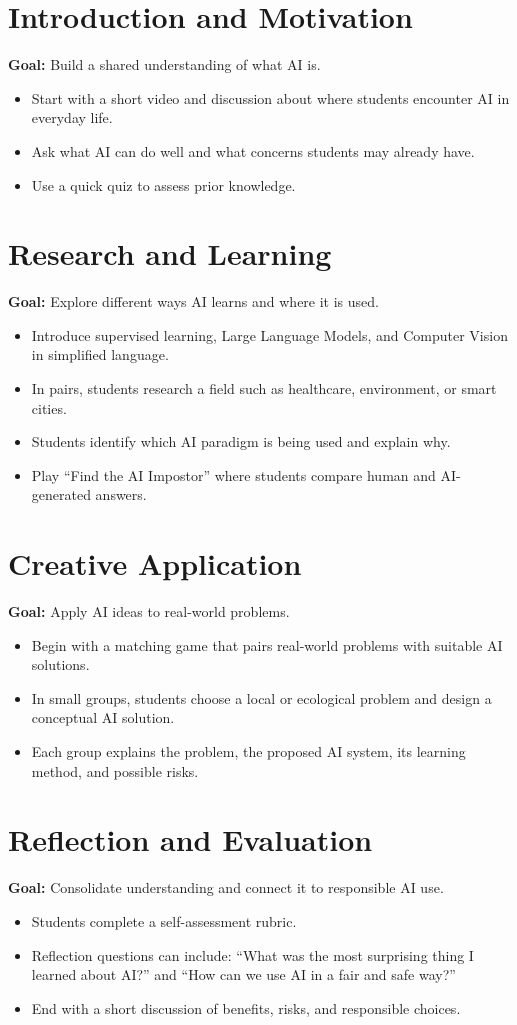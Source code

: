 \documentclass[11pt, a4paper]{article}
\begin{document}
\section{Introduction and Motivation}
\textbf{Goal:} Build a shared understanding of what AI is.
\begin{itemize}
    \item Start with a short video and discussion about where students encounter AI in everyday life.
    \item Ask what AI can do well and what concerns students may already have.
    \item Use a quick quiz to assess prior knowledge.
\end{itemize}

\section{Research and Learning}
\textbf{Goal:} Explore different ways AI learns and where it is used.
\begin{itemize}
    \item Introduce supervised learning, Large Language Models, and Computer Vision in simplified language.
    \item In pairs, students research a field such as healthcare, environment, or smart cities.
    \item Students identify which AI paradigm is being used and explain why.
    \item Play ``Find the AI Impostor'' where students compare human and AI-generated answers.
\end{itemize}

\section{Creative Application}
\textbf{Goal:} Apply AI ideas to real-world problems.
\begin{itemize}
    \item Begin with a matching game that pairs real-world problems with suitable AI solutions.
    \item In small groups, students choose a local or ecological problem and design a conceptual AI solution.
    \item Each group explains the problem, the proposed AI system, its learning method, and possible risks.
\end{itemize}

\section{Reflection and Evaluation}
\textbf{Goal:} Consolidate understanding and connect it to responsible AI use.
\begin{itemize}
    \item Students complete a self-assessment rubric.
    \item Reflection questions can include: ``What was the most surprising thing I learned about AI?'' and ``How can we use AI in a fair and safe way?''
    \item End with a short discussion of benefits, risks, and responsible choices.
\end{itemize}
\end{document}

